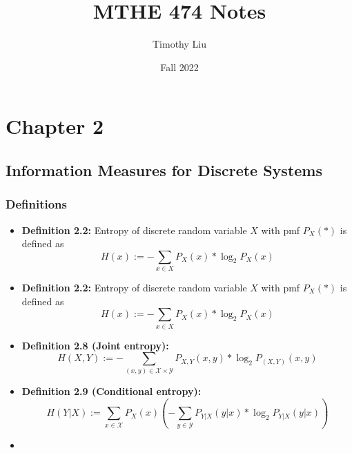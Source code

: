 \documentclass{article}
\begin{document}
\title{MTHE 474 Notes}
\author{Timothy Liu}
\date{Fall 2022}
\maketitle
\newpage

\tableofcontents

\newpage
\section{Chapter 2}
\subsection{Information Measures for Discrete Systems}
\subsubsection{Definitions}
\begin{flushleft}
    \begin{itemize}
   
    \item \textbf{Definition 2.2:} Entropy of discrete random variable \(X\) with pmf \(P_X(*)\) is defined as \[H(x):=-\sum_{x \in X}{P_X(x)*\log_{2}{P_X(x)}}\]

    \item \textbf{Definition 2.2:} Entropy of discrete random variable \(X\) with pmf \(P_X(*)\) is defined as \[H(x):=-\sum_{x \in X}{P_X(x)*\log_{2}{P_X(x)}}\]
    \item \textbf{Definition 2.8 (Joint entropy):} \[H(X,Y) := - \sum_{(x,y) \in \mathcal{X} \times \mathcal{Y}}{P_{X,Y}{(x,y)}*\log_{2}{P_({X,Y}){(x,y)}}}\]
    \item \textbf{Definition 2.9 (Conditional entropy):} \[H(Y|X) := \sum_{x \in \mathcal{X}} P_X(x) (-\sum_{y \in \mathcal{Y}} P_{Y|X}{(y|x)} * \log_{2}{P_{Y|X}{(y|x)}})\]
    \item 
    \end{itemize}
\end{flushleft}
\end{document}
